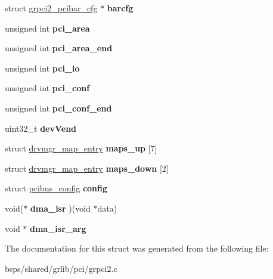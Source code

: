 \begin{DoxyCompactItemize}
\mbox{\label{structgrpci2__priv_a57c474a0644792594918157dd4bd5252}} 
struct \mbox{\hyperlink{structgrpci2__pcibar__cfg}{grpci2\+\_\+pcibar\+\_\+cfg}} $\ast$ {\bfseries barcfg}
\item 
\mbox{\label{structgrpci2__priv_a4b554c5749bed6c7ad20320a1c13cac4}} 
unsigned int {\bfseries pci\+\_\+area}
\item 
\mbox{\label{structgrpci2__priv_aa403704b824aa6e0938539a9be9b619e}} 
unsigned int {\bfseries pci\+\_\+area\+\_\+end}
\item 
\mbox{\label{structgrpci2__priv_aead298dbb6958965caff766ddcd18c7c}} 
unsigned int {\bfseries pci\+\_\+io}
\item 
\mbox{\label{structgrpci2__priv_a46fdaa0ec7119d86d2a4e16e17374353}} 
unsigned int {\bfseries pci\+\_\+conf}
\item 
\mbox{\label{structgrpci2__priv_abfedd5ec95ef932c3371c1b917ace985}} 
unsigned int {\bfseries pci\+\_\+conf\+\_\+end}
\item 
\mbox{\label{structgrpci2__priv_a7c1debbfa8703410a95b542a23c99fab}} 
uint32\+\_\+t {\bfseries dev\+Vend}
\item 
\mbox{\label{structgrpci2__priv_a1c398f16cb9f412a8e0e629258786429}} 
struct \mbox{\hyperlink{structdrvmgr__map__entry}{drvmgr\+\_\+map\+\_\+entry}} {\bfseries maps\+\_\+up} \mbox{[}7\mbox{]}
\item 
\mbox{\label{structgrpci2__priv_a23d51d051ebc85aef564a95f3e0fda84}} 
struct \mbox{\hyperlink{structdrvmgr__map__entry}{drvmgr\+\_\+map\+\_\+entry}} {\bfseries maps\+\_\+down} \mbox{[}2\mbox{]}
\item 
\mbox{\label{structgrpci2__priv_a70c6aa6dbcab636e00289865c94307fb}} 
struct \mbox{\hyperlink{structpcibus__config}{pcibus\+\_\+config}} {\bfseries config}
\item 
\mbox{\label{structgrpci2__priv_aa20991fbd95edd72428fbbb924294499}} 
void($\ast$ {\bfseries dma\+\_\+isr} )(void $\ast$data)
\item 
\mbox{\label{structgrpci2__priv_aa3bb3651dde90bb12e08ab017314b99a}} 
void $\ast$ {\bfseries dma\+\_\+isr\+\_\+arg}
\end{DoxyCompactItemize}


The documentation for this struct was generated from the following file\+:\begin{DoxyCompactItemize}
\item 
bsps/shared/grlib/pci/grpci2.\+c\end{DoxyCompactItemize}
